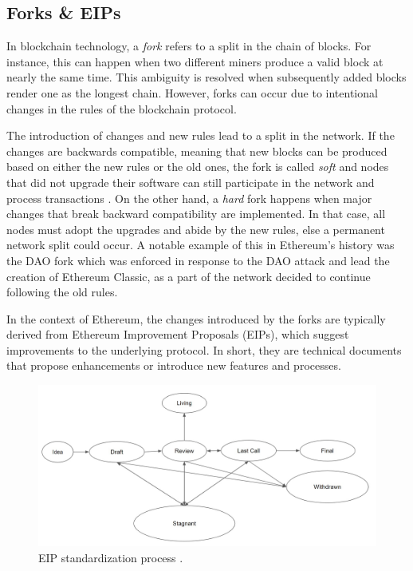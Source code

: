\subsection{Forks \& EIPs}\label{sec:gas}
In blockchain technology, a \textit{fork} refers to a split in the chain of blocks. For instance, this can happen when two different miners produce a valid block at nearly the same time. This ambiguity is resolved when subsequently added blocks render one as the longest chain. However, forks can occur due to intentional changes in the rules of the blockchain protocol. 

The introduction of changes and new rules lead to a split in the network. If the changes are backwards compatible, meaning that new blocks can be produced based on either the new rules or the old ones, the fork is called \textit{soft} and nodes that did not upgrade their software can still participate in the network and process transactions \citep{etherscaninformationcenter_2022}. On the other hand, a \textit{hard} fork happens when major changes that break backward compatibility are implemented. In that case, all nodes must adopt the upgrades and abide by the new rules, else a permanent network split could occur. A notable example of this in Ethereum's history was the DAO fork \citep{ethereumfoundation_2023} which was enforced in response to the DAO attack \citep{vujicic_2018} and lead the creation of Ethereum Classic, as a part of the network decided to continue following the old rules.

In the context of Ethereum, the changes introduced by the forks are typically derived from Ethereum Improvement Proposals (EIPs), which suggest improvements to the underlying protocol. In short, they are technical documents that propose enhancements or introduce new features and processes. 

\begin{figure}[htbp]
\centerline{\includegraphics[width=\textwidth]{figs/eip_stages.jpg}}
\caption{EIP standardization process \citep{ethereumfoundation_2023b}.}
\label{fig: eip_stages}
\end{figure}

